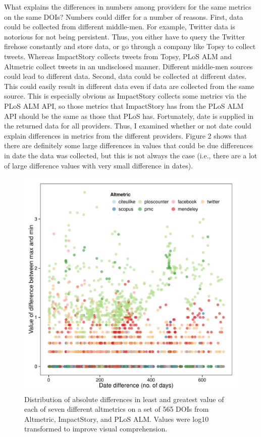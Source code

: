 \documentclass[letterpaper,superscriptaddress,showkeys,longbibliography]{revtex4-1}\usepackage{graphicx, color}
\newenvironment{knitrout}{}{} %
\begin{document}
What explains the differences in numbers among providers for the same metrics on the same DOIs? Numbers could differ for a number of reasons. First, data could be collected from different middle-men. For example, Twitter data is notorious for not being persistent. Thus, you either have to query the Twitter firehose constantly and store data, or go through a company like Topsy to collect tweets. Whereas ImpactStory collects tweets from Topsy, PLoS ALM and Altmetric collect tweets in an undisclosed manner. Different middle-men sources could lead to different data. Second, data could be collected at different dates. This could easily result in different data even if data are collected from the same source. This is especially obvious as ImpactStory collects some metrics via the PLoS ALM API, so those metrics that ImpactStory has from the PLoS ALM API should be the same as those that PLoS has. Fortunately, date is supplied in the returned data for all providers. Thus, I examined whether or not date could explain differences in metrics from the different providers. Figure 2 shows that there are definitely some large differences in values that could be due differences in date the data was collected, but this is not always the case (i.e., there are a lot of large difference values with very small difference in dates). 

\begin{knitrout}
\color{fgcolor}\begin{figure}[]


{\centering \includegraphics[width=.7\linewidth]{figure/dataconst_plot2} 

}

\caption[Distribution of absolute differences in least and greatest value of each of seven different altmetrics on a set of 565 DOIs from Altmetric, ImpactStory, and PLoS ALM]{Distribution of absolute differences in least and greatest value of each of seven different altmetrics on a set of 565 DOIs from Altmetric, ImpactStory, and PLoS ALM. Values were log10 transformed to improve visual comprehension.\label{fig:dataconst_plot2}}
\end{figure}


\end{knitrout}
\end{document}
